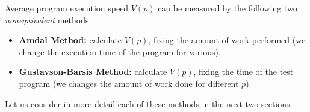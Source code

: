 {\begin{equation}
	\end{equation}
	\par Average program execution speed $V(p)$ can be measured by the following two \textit{nonequivalent} methods
	\begin{itemize}
		\item\textbf{Amdal Method:} calculate $V(p)$, fixing the amount of work performed (we change the execution time of the program for various).
		\item\textbf{Gustavson-Barsis Method:} calculate $V(p)$, fixing the time of the test program (we changes the amount of work done for different $ p $).
	\end{itemize}
Let us consider in more detail each of these methods in the next two sections.
	\par
}